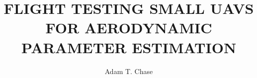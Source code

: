 \documentclass[12pt]{ucthesis}
\title{FLIGHT TESTING SMALL UAVS FOR AERODYNAMIC PARAMETER ESTIMATION}
\author{Adam T. Chase}
\begin{document}
\maketitle

\begin{frontmatter}
	
	\copyrightpage
	\committeemembershippage

\begin{abstract}

\end{abstract}

\begin{acknowledgements}

\end{acknowledgements}


\tableofcontents


\listoftables

\listoffigures

\printnomenclature

\end{frontmatter}

\pagestyle{plain}

\renewcommand{\baselinestretch}{1.66}









%


%
\clearpage
\begin{appendices}



%
%

%
\end{appendices}


\clearpage



\end{document}
